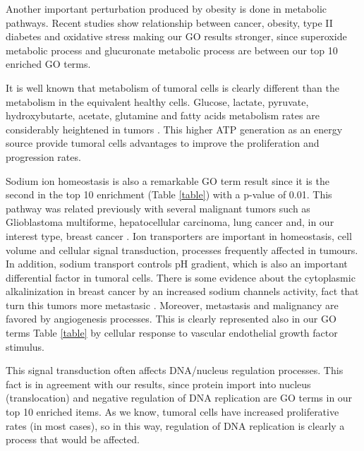 \documentclass[9pt,twocolumn,twoside]{gsajnl}
\begin{document}
Another important perturbation produced by obesity is done in metabolic pathways. Recent studies show relationship between cancer, obesity, type II diabetes and oxidative stress \citep{Ferroni2015,Flanagan2015} making our GO results stronger, since superoxide metabolic process and glucuronate metabolic process are between our top 10 enriched GO terms.
\vspace{2mm}

It is well known that metabolism of tumoral cells is clearly different than the metabolism in the equivalent healthy cells. Glucose, lactate, pyruvate, hydroxybutarte, acetate, glutamine and fatty acids metabolism rates are considerably heightened in tumors \citep{Martinez-Outschoorn2016}. This higher ATP generation as an energy source provide tumoral cells advantages to improve the proliferation and progression rates.
\vspace{2mm}

Sodium ion homeostasis is also a remarkable GO term result since it is the second in the top 10 enrichment (Table \ref{table}) with a p-value of 0.01. This pathway was related previously with several malignant tumors such as Glioblastoma multiforme, hepatocellular carcinoma, lung cancer and, in our interest type, breast cancer \citep{DaminCong2015}. Ion transporters are important in homeostasis, cell volume and cellular signal transduction, processes frequently affected in tumours. In addition, sodium transport controls pH gradient, which is also an important differential factor in tumoral cells. There is some evidence about the cytoplasmic alkalinization in breast cancer by an increased sodium channels activity, fact that turn this tumors more metastasic \citep{Amith1259,Fraser20130105}. Moreover, metastasis and malignancy are favored by angiogenesis processes. This is clearly represented also in our GO terms Table \ref{table} by cellular response to vascular endothelial growth factor stimulus.
\vspace{2mm}

This signal transduction often affects DNA/nucleus regulation processes. This fact is in agreement with our results, since protein import into nucleus (translocation) and negative regulation of DNA replication are GO terms in our top 10 enriched items. As we know, tumoral cells have increased proliferative rates (in most cases), so in this way, regulation of DNA replication is clearly a process that would be affected.
\vspace{2mm}
\end{document}
